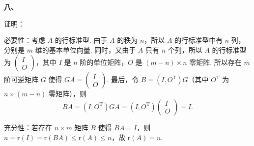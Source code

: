 \documentclass[a4paper,11pt]{ctexart}
\newcommand{\rk}{\mathrm{r}}
\newcommand{\T}{\mathrm{T}}
\begin{document}
\textbf{八、}

证明：

必要性：考虑 $A$ 的行标准型. 由于 $A$ 的秩为 $n$，所以 $A$ 的行标准型中有 $n$ 列，分别是 $m$ 维的基本单位向量. 同时，又由于 $A$ 只有 $n$ 个列，所以 $A$ 的行标准型为 $\begin{pmatrix} I \\ O \end{pmatrix}$，其中 $I$ 是 $n$ 阶的单位矩阵，$O$ 是 $(m - n) \times n$ 零矩阵. 所以存在 $m$ 阶可逆矩阵 $G$ 使得 $GA = \begin{pmatrix} I \\ O \end{pmatrix}$. 最后，令 $B = (I, O^{\T})G$（其中 $O^{\T}$ 为 $n \times (m - n)$ 零矩阵），则
\[
  BA = (I, O^{\T})GA = (I, O^{\T})\begin{pmatrix} I \\ O \end{pmatrix} = I.
\]

充分性：若存在 $n \times m$ 矩阵 $B$ 使得 $BA = I$，则 $n = \rk(I) = \rk(BA) \le \rk(A) \le n$，故 $\rk(A) = n$.
\end{document}
